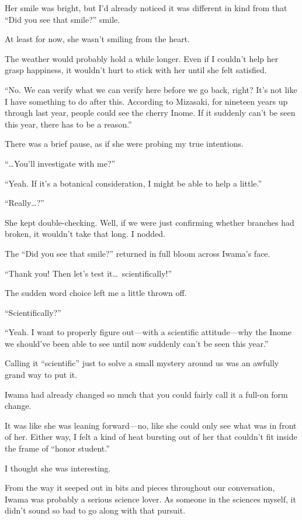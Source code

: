 \documentclass[
    a4paper,
    12pt,
    twoside,
    openany,
    UTF8,
    fontset=windows
]{ctexbook}
\begin{document}
Her smile was bright, but I'd already noticed it was different in kind from that ``Did you see that smile?'' smile.

At least for now, she wasn't smiling from the heart.

The weather would probably hold a while longer. Even if I couldn't help her grasp happiness, it wouldn't hurt to stick with her until she felt satisfied.

``No. We can verify what we can verify here before we go back, right? It's not like I have something to do after this. According to Mizasaki, for nineteen years up through last year, people could see the cherry Inome. If it suddenly can't be seen this year, there has to be a reason.''

There was a brief pause, as if she were probing my true intentions.

``\dots You'll investigate with me?''

``Yeah. If it's a botanical consideration, I might be able to help a little.''

``Really\dots?''

She kept double-checking. Well, if we were just confirming whether branches had broken, it wouldn't take that long. I nodded.

The ``Did you see that smile?'' returned in full bloom across Iwama's face.

``Thank you! Then let's test it\dots\ scientifically!''

The sudden word choice left me a little thrown off.

``Scientifically?''

``Yeah. I want to properly figure out---with a scientific attitude---why the Inome we should've been able to see until now suddenly can't be seen this year.''

Calling it ``scientific'' just to solve a small mystery around us was an awfully grand way to put it.

Iwama had already changed so much that you could fairly call it a full-on form change.

It was like she was leaning forward---no, like she could only see what was in front of her. Either way, I felt a kind of heat bursting out of her that couldn't fit inside the frame of ``honor student.''

I thought she was interesting.

From the way it seeped out in bits and pieces throughout our conversation, Iwama was probably a serious science lover. As someone in the sciences myself, it didn't sound so bad to go along with that pursuit.
\end{document}
